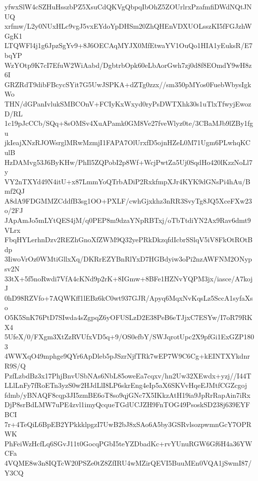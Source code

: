 yfwxSlW4cSZHuHsszbPZ5XsuCdQKVgQbpqIbOhZ5ZOUrlrxPzafmfiDWdNQtJNUQ
xrfmw/L2y0NUxHLc9vgJ5vxEYdoYpDHSm20ZhQHEnVDXUOLsszKI5fFGJzhWGgK1
LTQWFl4j1g6JpzSgYv9+8J6OECAqMYJX0MfEtwaYV1OuQo1HIA1yEuksR/E7bqYP
WzYOtp9K7cI7EfuW2WiAabd/DgbtrbOpk60eLbAorGwh7zj0d8f8EOmdY9wH8z6I
GRZRdT9dibFBcycSYit7G5UwJSPKA+dZTg0zzx//sm350pMYos0FuebWbysIgkWo
THN/dGPanIvlukSMBCOnV+FCIyKxWxyd0ryPsDWTXhk30s1uTlxTfwyjEwozD/RL
1c19pJcCCb/SQq+8sOMSv4XuAPamk0GM8Ve27fveWlyz0te/3CBaMJb9lZBy1fgu
jkIeajXNzRJOWsrglMRwMzmjI1FAPA7OlUrxfD5ojnHZeL0M71Ugm6PLwhqKCulB
HzDAMvg53J6ByKHw/PhIl5ZQPobI2p8Wf+WcjPwtZa5Uj0SqdHo420lKzzNoLl7y
VY2nTXYd49N4itU+x87LmmYoQTrbADiP2RxkfmpXJr4KYK9dGNsPi4hAu/Bmf2QJ
A8dA9FDGMMZCddfB3sg1OO+PXLF/cwhGjxkhz3nRR3SvyTg8JQ5XceFXw23o/2FJ
JApAmJo5mLYtQES4jM/q0PEP8m9dzaYNpRBTxj/oTbTtdiYN2Ax9Rav6dmt9VLrx
FbqHYLerhnDzv2REZhGnoXfZWM9Q32yePRkDkzqfdIcbrSSlqV5iV8FkOtROtBdp
3IiwoVrOz0WMtiGllxXq/DKRrEZYBnRlYxD7HGBdyiw3oPi2nzAWFNM2ONypsv2N
33tX+5f5noRwdi7VfA4cKNd9p2rK+8IGmw+8BFe1HZNvYQPM3jx/iasce/A7kojJ
0hD98RZVfo+7AQWKff1lEBz6kC0wt937GJR/Apyq6MqxNvKqsLz5SccA1syfaXso
O5K5SnK76PtD7SIwda4sZgpqZ6yOFUSLzD2E38PeB6eTJjxC7ESYw/I7oR79RKX4
5UfeX/0/FXgm3XtZzRVUfxVD5q+9/OS0efbY/SWJqrotUpc2X9pfGi1ExGZP1803
4WWXqO49mphge9QYr6ApDleb5pJSzrNjfTRk7wEP7W9C6Cg+kEINTXYkdnrR9S/Q
PzfLzbdBz3x17PhjBnvUSbNAs6NbL85oweEa7cqxv/hn2Uw32XEwdx+yzj//I44T
LLlLnFy7fRoETn3yzS0w2HJdLlI8LP6skrEng4eIp5aX6SKVvHqeEJMtfCGZcgoj
fdmb/yBNAQF8cqp3JI5zmBE6oT8so9qjGNc7X5IKkzAtH19ia9JpRrRapAin7iRx
DjP8srBdLMW7uPE4zvl1imyQcqueTGdUCJZH9FnTOG49PsoskSD238j639EYFBCI
7r+4TeQiL6BpEB2YPkkklpgzI7UwB2bJ8xSAo6A5by3GSRvlsozpwmnGcY7OPRWK
PhFeiWzHcfLq6SGvJ11t0GocqPGbI5teYZDbadKc+rvYUnuRGW6Gf6H4a36YWCFa
4VQME8w3n8IQTcW20PSZe0tZ8ZfIRU4wMZirQEVI5BuuMEn0VQA1jSwmI87/Y3CQ

